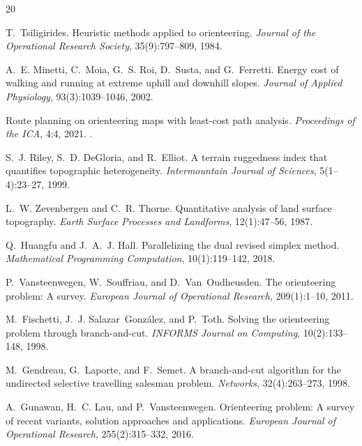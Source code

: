 \documentclass[11pt,a4paper]{article}
\begin{document}
\begin{thebibliography}{20}

T.~Tsiligirides.
\newblock Heuristic methods applied to orienteering.
\newblock \emph{Journal of the Operational Research Society}, 35(9):797--809, 1984.

A.~E. Minetti, C.~Moia, G.~S. Roi, D.~Susta, and G.~Ferretti.
\newblock Energy cost of walking and running at extreme uphill and downhill slopes.
\newblock \emph{Journal of Applied Physiology}, 93(3):1039--1046, 2002.

Route planning on orienteering maps with least-cost path analysis.
\newblock \emph{Proceedings of the ICA}, 4:4, 2021.
\newblock {}.

S.~J. Riley, S.~D. DeGloria, and R.~Elliot.
\newblock A terrain ruggedness index that quantifies topographic heterogeneity.
\newblock \emph{Intermountain Journal of Sciences}, 5(1--4):23--27, 1999.

L.~W. Zevenbergen and C.~R. Thorne.
\newblock Quantitative analysis of land surface topography.
\newblock \emph{Earth Surface Processes and Landforms}, 12(1):47--56, 1987.

Q.~Huangfu and J.~A.~J. Hall.
\newblock Parallelizing the dual revised simplex method.
\newblock \emph{Mathematical Programming Computation}, 10(1):119--142, 2018.

P.~Vansteenwegen, W.~Souffriau, and D.~Van~Oudheusden.
\newblock The orienteering problem: A survey.
\newblock \emph{European Journal of Operational Research}, 209(1):1--10, 2011.

M.~Fischetti, J.~J. Salazar~Gonz\'{a}lez, and P.~Toth.
\newblock Solving the orienteering problem through branch-and-cut.
\newblock \emph{INFORMS Journal on Computing}, 10(2):133--148, 1998.

M.~Gendreau, G.~Laporte, and F.~Semet.
\newblock A branch-and-cut algorithm for the undirected selective travelling salesman problem.
\newblock \emph{Networks}, 32(4):263--273, 1998.

A.~Gunawan, H.~C. Lau, and P.~Vansteenwegen.
\newblock Orienteering problem: A survey of recent variants, solution approaches and applications.
\newblock \emph{European Journal of Operational Research}, 255(2):315--332, 2016.


\end{thebibliography}
\end{document}
